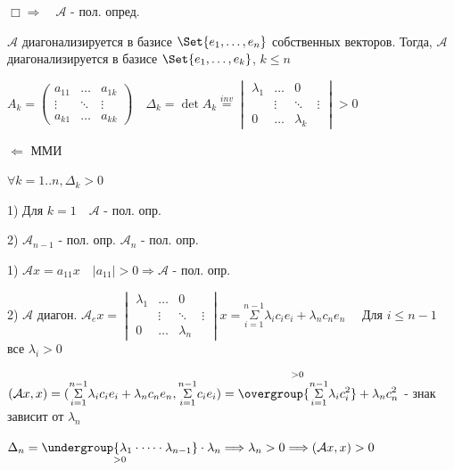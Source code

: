 \documentclass[12pt]{article}
\begin{document}
    $\Box \Longrightarrow \quad \mathcal{A}$ - пол. опред.

    $\mathcal{A}$ диагонализируется в базисе $\displaystyle \Set{e_1, \dots, e_n}$ собственных векторов.
    Тогда, $\mathcal{A}$ диагонализируется в базисе $\displaystyle \Set{e_1, \dots, e_k}$, $k \leq n$

    $\displaystyle A_k = \begin{pmatrix}a_{11} & \dots & a_{1k} \\ \vdots & \ddots & \vdots \\ a_{k1} & \dots & a_{kk}\end{pmatrix} \quad
    \Delta_k = \det A_k \stackrel{inv}{=} \begin{vmatrix}\lambda_{1} & \dots & 0 \\ & \vdots & \ddots & \vdots \\ 0 & \dots & \lambda_{k}\end{vmatrix} > 0$

    $\Longleftarrow$ ММИ

    $\displaystyle \forall k = 1..n, \Delta_k > 0$

    1) Для $k = 1 \quad \mathcal{A}$ - пол. опр.

    2) $\displaystyle \mathcal{A}_{n-1}$ - пол. опр. \Longrightarrow $\displaystyle \mathcal{A}_n$ - пол. опр.

    1) $\displaystyle \mathcal{A}x = a_{11}x \quad |a_{11}| > 0 \Longrightarrow \mathcal{A}$ - пол. опр.

    2) $\mathcal{A}$ диагон. \quad $\displaystyle \mathcal{A}_e x =
    \begin{vmatrix}\lambda_{1} & \dots & 0 \\ & \vdots & \ddots & \vdots \\ 0 & \dots & \lambda_{n}\end{vmatrix}x =
    \overset{n - 1}{\underset{i = 1}{\Sigma}}\lambda_i c_i e_i + \lambda_n c_n e_n \quad$ Для $i \leq n - 1$ все $\displaystyle \lambda_i > 0$

    $\displaystyle (\mathcal{A}x, x) = (\overset{n - 1}{\underset{i = 1}{\Sigma}} \lambda_i c_i e_i + \lambda_n c_n e_n,
    \overset{n - 1}{\underset{i = 1}{\Sigma}} c_i e_i) = \overset{> 0}{\overgroup{\overset{n - 1}{\underset{i = 1}{\Sigma}} \lambda_i c_i^2}} + \lambda_n c_n^2$ - знак зависит от $\displaystyle \lambda_n$

    $\displaystyle \Delta_n = \underset{> 0}{\undergroup{\lambda_1 \cdot \dots \cdot \lambda_{n-1}}} \cdot \lambda_n
    \Longrightarrow \lambda_n > 0 \Longrightarrow (\mathcal{A}x, x) > 0$
\end{document}
